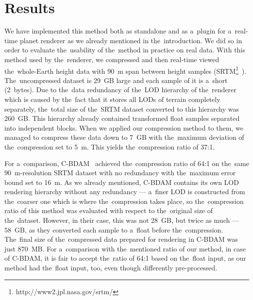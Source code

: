 \chapter{Results}\label{chap:results}

We have implemented this method both as standalone and as a~plugin for a~real-time planet renderer as we already mentioned in the~introduction. We did so in order to evaluate the~usability of the~method in practice on real data. With this method used by the~renderer, we compressed and then real-time viewed the~whole-Earth height data with 90~m span between height samples (SRTM\footnote{http://www2.jpl.nasa.gov/srtm/}~\cite{srtm}). The~uncompressed dataset is 29~GB large and each sample of it is a~short (2~bytes). Due to the~data redundancy of the~LOD hierarchy of the~renderer which is caused by the~fact that it stores all LODs of terrain completely separately, the~total size of the~SRTM dataset converted to this hierarchy was 260~GB. This hierarchy already contained transformed float samples separated into independent blocks. When we applied our compression method to them, we managed to compress these data down to 7~GB with the~maximum deviation of the~compression set to 5~m. This yields the~compression ratio of 37:1.

For a~comparison, C-BDAM~\cite{cbdam} achieved the~compression ratio of 64:1 on the~same 90~m-resolution SRTM dataset with no redundancy with the~maximum error bound set to 16~m. As we already mentioned, C-BDAM contains its own LOD rendering hierarchy without any redundancy --- a~finer LOD is constructed from the~coarser one which is where the~compression takes place, so the~compression ratio of this method was evaluated with respect to the~original size of the~dataset. However, in their case, this was not 28~GB, but twice as much --- 58~GB, as they converted each sample to a~float before the~compression. The~final size of the~compressed data prepared for rendering in C-BDAM was just 870~MB. For a~comparison with the~mentioned ratio of our method, in case of C-BDAM, it is fair to accept the~ratio of 64:1 based on the~float input, as our method had the~float input, too, even though differently pre-processed.

